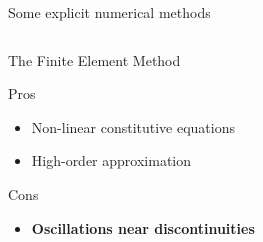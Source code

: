 \begin{withoutheadline}
  \begin{frame}{Some explicit numerical methods}
    \vspace{-0.5cm}
    \begin{overprint}
      \vspace{-0.65cm}
      \begin{columns}
        \begin{column}{0.49\textwidth}
          \begin{block}{The Finite Element Method \cite{Belytschko}}
            \begin{footnotesize}
              \begin{block}{\footnotesize Pros}
                \vspace{-0.2cm}
                \begin{itemize}
                \item[] Non-linear constitutive equations
                \item[] High-order approximation
                \end{itemize}
              \end{block}
              \vspace{-0.2cm}
              \begin{block}{\footnotesize Cons}
                \vspace{-0.2cm}
                \begin{itemize}
                \item[] \textbf{Oscillations near discontinuities} 
                \end{itemize}
              \end{block}
            \end{footnotesize}
          \end{block}
        \end{column}
        \begin{column}{0.49\textwidth}
          \begin{block}{}
            \centering
            
          \end{block}
        \end{column}
      \end{columns}
      \vspace{-0.25cm}

\end{overprint}
\end{frame}
\end{withoutheadline}
